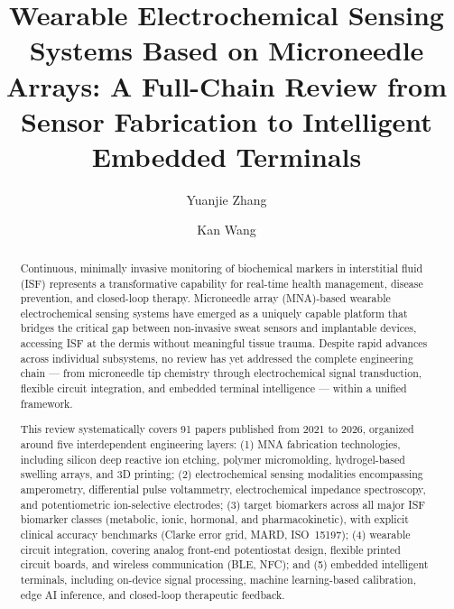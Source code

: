 \documentclass[review,1p]{elsarticle}
\begin{document}
\begin{frontmatter}

\title{Wearable Electrochemical Sensing Systems Based on Microneedle Arrays: A Full-Chain Review from Sensor Fabrication to Intelligent Embedded Terminals}

\author[inst1]{Yuanjie Zhang}
\author[inst1]{Kan Wang}



\begin{abstract}
Continuous, minimally invasive monitoring of biochemical markers in interstitial fluid (ISF) represents a transformative capability for real-time health management, disease prevention, and closed-loop therapy. Microneedle array (MNA)-based wearable electrochemical sensing systems have emerged as a uniquely capable platform that bridges the critical gap between non-invasive sweat sensors and implantable devices, accessing ISF at the dermis without meaningful tissue trauma. Despite rapid advances across individual subsystems, no review has yet addressed the complete engineering chain — from microneedle tip chemistry through electrochemical signal transduction, flexible circuit integration, and embedded terminal intelligence — within a unified framework.

This review systematically covers 91 papers published from 2021 to 2026, organized around five interdependent engineering layers: (1) MNA fabrication technologies, including silicon deep reactive ion etching, polymer micromolding, hydrogel-based swelling arrays, and 3D printing; (2) electrochemical sensing modalities encompassing amperometry, differential pulse voltammetry, electrochemical impedance spectroscopy, and potentiometric ion-selective electrodes; (3) target biomarkers across all major ISF biomarker classes (metabolic, ionic, hormonal, and pharmacokinetic), with explicit clinical accuracy benchmarks (Clarke error grid, MARD, ISO~15197); (4) wearable circuit integration, covering analog front-end potentiostat design, flexible printed circuit boards, and wireless communication (BLE, NFC); and (5) embedded intelligent terminals, including on-device signal processing, machine learning-based calibration, edge AI inference, and closed-loop therapeutic feedback.


\end{abstract}
\end{frontmatter}
\end{document}

